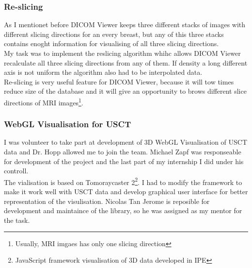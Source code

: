 \documentclass[english]{article}
\begin{document}
\subsubsection{Re-slicing}

As I mentionet before DICOM Viewer keeps three different stacks of images with different slicing directions for an every breast, but any of this three stacks contains enoght information for visualising of all three slicing directions.\\

My task was to implement the reslicing algorithm whihc allows DICOM Viewer recalculate all three slicing directions from any of them. If density a long different axis is not uniform the algorithm also had to be interpolated data.\\

Re-slicing is very useful feature for DICOM Viewer, because it will tow times reduce size of the database and it will give an opportunity to brows different slice directions of MRI images\footnote{Usually, MRI imgaes has only one slicing direction}.\\

\subsubsection{WebGL Visualisation for USCT}

I was volunteer to take part at development of 3D WebGL Visualisation of USCT data and Dr. Hopp allowed me to join the team. Michael Zapf was responseable for development of the project and the last part of my internship I did under his controll.\\

The vialisation is based on Tomoraycaster 2\footnote{JavaScript framework visualisation of 3D data developed in IPE}. I had to modify the framework to make it work well with USCT data and develop graphical user interface for better representation of the  visulisation. Nicolas Tan Jerome is reposible for development and maintaince of the library, so he was assigned as my mentor for the task.\\
\end{document}
